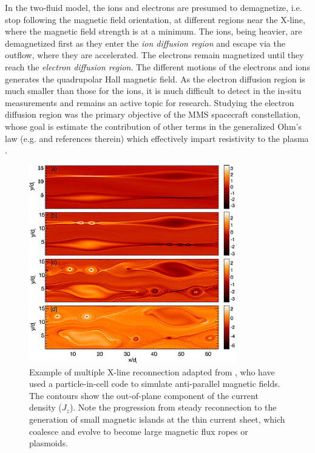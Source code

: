 In the two-fluid model, the ions and electrons are presumed to demagnetize, i.e. stop following the magnetic field orientation, at different regions near the X-line, where the magnetic field strength is at a minimum. The ions, being heavier, are demagnetized first as they enter the \emph{ion diffusion region} and escape via the outflow, where they are accelerated. The electrons remain magnetized until they reach the \emph{electron diffusion region}. The different motions of the electrons and ions generates the quadrupolar Hall magnetic field. As the electron diffusion region is much smaller than those for the ions, it is much difficult to detect in the in-situ measurements and remains an active topic for research. Studying the electron diffusion region was the primary objective of the MMS spacecraft constellation, whose goal is estimate the contribution of other terms in the generalized Ohm's law (e.g.  and references therein) which effectively impart resistivity to the plasma \cite{Burch2016MagnetosphericObjectives}.  

\begin{figure}
    \centering
    \includegraphics[width=0.8\textwidth]{images1/reconnection-multiplexline-example.png}
    \caption{Example of multiple X-line reconnection adapted from \protect{}, who have used a particle-in-cell code to simulate anti-parallel magnetic fields. The contours show the out-of-plane component of the current density ($J_z$). Note the progression from steady reconnection to the generation of small magnetic islands at the thin current sheet, which coalesce and evolve to become large magnetic flux ropes or plasmoids.}
    \label{fig:example-multiplexline-reconnection}
\end{figure}

